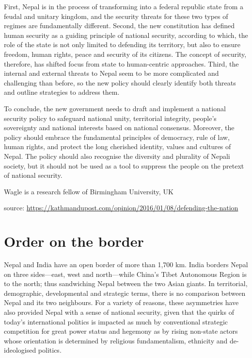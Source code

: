 \documentclass[
  openany]{book}
\begin{document}
First, Nepal is in the process of transforming into a federal republic state from a feudal and unitary kingdom, and the security threats for these two types of regimes are fundamentally different. Second, the new constitution has defined human security as a guiding principle of national security, according to which, the role of the state is not only limited to defending its territory, but also to ensure freedom, human rights, peace and security of its citizens. The concept of security, therefore, has shifted focus from state to human-centric approaches. Third, the internal and external threats to Nepal seem to be more complicated and challenging than before, so the new policy should clearly identify both threats and outline strategies to address them.

To conclude, the new government needs to draft and implement a national security policy to safeguard national unity, territorial integrity, people's sovereignty and national interests based on national consensus. Moreover, the policy should embrace the fundamental principles of democracy, rule of law, human rights, and protect the long cherished identity, values and cultures of Nepal. The policy should also recognise the diversity and plurality of Nepali society, but it should not be used as a tool to suppress the people on the pretext of national security.

Wagle is a research fellow of Birmingham University, UK

source: \url{https://kathmandupost.com/opinion/2016/01/08/defending-the-nation}

\hypertarget{order-on-the-border}{%
\section{Order on the border}\label{order-on-the-border}}

Nepal and India have an open border of more than 1,700 km. India borders Nepal on three sides---east, west and north---while China's Tibet Autonomous Region is to the north; thus sandwiching Nepal between the two Asian giants. In territorial, demographic, developmental and strategic terms, there is no comparison between Nepal and its two neighbours. For a variety of reasons, these asymmetries have also provided Nepal with a sense of national security, given that the quirks of today's international politics is impacted as much by conventional strategic competition for great power status and hegemony as by rising non-state actors whose orientation is determined by religious fundamentalism, ethnicity and de-ideologised politics.
\end{document}
